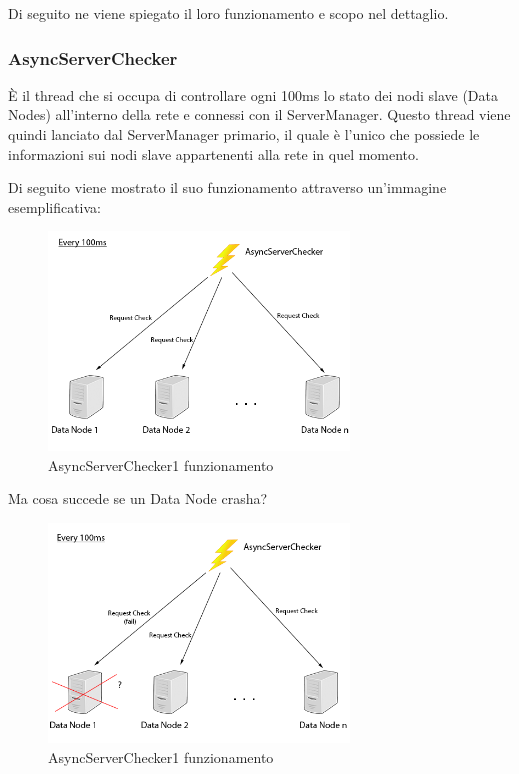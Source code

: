 \documentclass[]{article}
\begin{document}
Di seguito ne viene spiegato il loro funzionamento e scopo nel dettaglio.

\subsubsection{AsyncServerChecker}

È il thread che si occupa di controllare ogni 100ms lo stato dei nodi slave (Data Nodes) all'interno della rete e connessi con il ServerManager. Questo thread viene quindi lanciato dal ServerManager primario, il quale è l'unico che possiede le informazioni sui nodi slave appartenenti alla rete in quel momento.

\vspace{0.3cm}
Di seguito viene mostrato il suo funzionamento attraverso un'immagine esemplificativa:

\begin{figure}[h]
	\centering
	\includegraphics[width=8cm]{../Img/AsyncServerChecker1.png}
	\caption[]{AsyncServerChecker1 funzionamento}
	\label{fig:AsyncServerChecker1}
	
\end{figure}


\vspace{3cm}

Ma cosa succede se un Data Node crasha?

\begin{figure}[h]
	\centering
	\includegraphics[width=8cm]{../Img/AsyncServerChecker_crash.png}
	\caption[]{AsyncServerChecker1 funzionamento}
	\label{fig:AsyncServerChecker_crash}
	
\end{figure}
\end{document}

